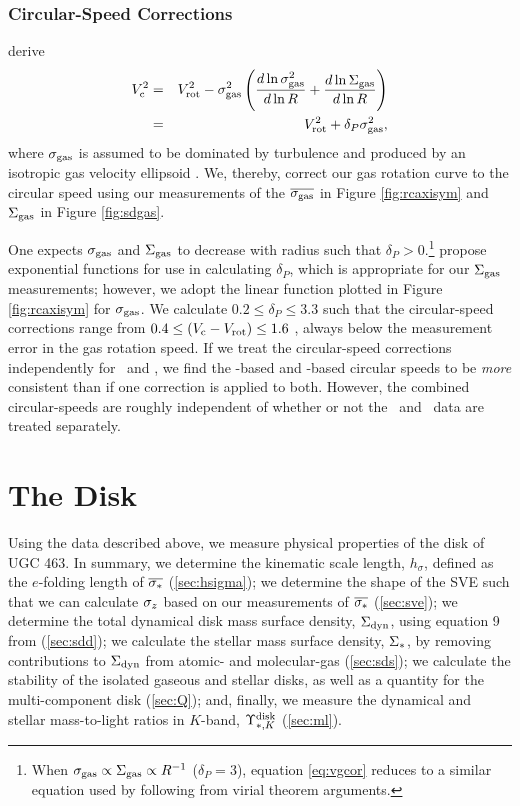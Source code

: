 \documentclass[apj,iop,numberedappendix]{emulateapj}
\begin{document}
\subsubsection{Circular-Speed Corrections}
\label{sec:vccorr}

\citet{2010ApJ...721..547D} derive
%
\begin{eqnarray}
%
\vc^2 & = & \vrot^2 - \sgas^2 \left(\frac{d\ln\sgas^2}{d\ln R} +
\frac{d\ln\sdg}{d\ln R}\right) \nonumber \\ & = & \vrot^2 + \delta_P \sgas^2,
%
\label{eq:vgcor}
%
\end{eqnarray}
%
where $\sigma_{\rm gas}$ is assumed to be dominated by turbulence and produced by an
isotropic gas velocity ellipsoid \citep[cf.][]{2009MNRAS.392..294A}.  We,
thereby, correct our gas rotation curve to the circular speed using our
measurements of the $\overline{\sigma_{\rm gas}}$ in Figure \ref{fig:rcaxisym} and $\Sigma_{\rm gas}$ in
Figure \ref{fig:sdgas}.  

One expects $\sigma_{\rm gas}$ and $\Sigma_{\rm gas}$ to decrease with radius such that $\delta_P >
0$.\footnote{
%
When $\sigma_{\rm gas} \propto \Sigma_{\rm gas} \propto R^{-1}$ ($\delta_P = 3$), equation
\ref{eq:vgcor} reduces to a similar equation used by \citet{2003ApJ...587L..19S}
following from virial theorem arguments.
%
}  \citet{2010ApJ...721..547D} propose exponential functions for use in
calculating $\delta_P$, which is appropriate for our $\Sigma_{\rm gas}$ measurements;
however, we adopt the linear function plotted in Figure \ref{fig:rcaxisym} for
$\sigma_{\rm gas}$.  We calculate $0.2 \leq \delta_P \leq 3.3$ such that the circular-speed
corrections range from $0.4\leq (V_{\rm c}-V_{\rm rot}) \leq 1.6$ \kms, always below the
measurement error in the gas rotation speed.  If we treat the circular-speed
corrections independently for \oiii\ and \halp, we find the \halp-based and
\oiii-based circular speeds to be {\it more} consistent than if one correction
is applied to both.  However, the combined circular-speeds are roughly
independent of whether or not the \halp\ and \oiii\ data are treated separately.

\section{The Disk}
\label{sec:disk}

Using the data described above, we measure physical properties of the disk of
UGC 463.  In summary, we determine the kinematic scale length, $h_{\sigma}$,
defined as the $e$-folding length of $\overline{\sigma_{\ast}}$ (\sect \ref{sec:hsigma});
we determine the shape of the SVE such that we can calculate $\sigma_z$ based on
our measurements of $\overline{\sigma_{\ast}}$ (\sect \ref{sec:sve}); we determine the
total dynamical disk mass surface density, $\Sigma_{\rm dyn}$, using equation 9 from
 (\sect \ref{sec:sdd}); we calculate the stellar
mass surface density, $\Sigma_{\rm \ast}$, by removing contributions to $\Sigma_{\rm dyn}$ from
atomic- and molecular-gas (\sect \ref{sec:sds}); we calculate the stability of
the isolated gaseous and stellar disks, as well as a quantity for the
multi-component disk (\sect \ref{sec:Q}); and, finally, we measure the dynamical
and stellar mass-to-light ratios in $K$-band, $\Upsilon_{\ast,K}^{\rm disk}$ (\sect \ref{sec:ml}). 
\end{document}
